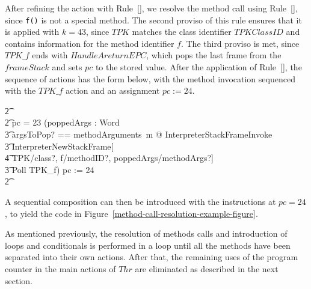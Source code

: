 After refining the action with
Rule~[], we resolve the method call
using Rule~[], since \texttt{f()}
is not a special method.
The second proviso of this rule ensures that it is applied with
$k = 43$, since $TPK$ matches the class identifier $TPKClassID$ and
contains information for the method identifier $f$.
The third proviso is met, since $TPK\_f$ ends with $HandleAreturnEPC$,
which pops the last frame from the $frameStack$ and sets $pc$ to the
stored value.
After the application of Rule~[],
the sequence of actions has the form below, with the method invocation
sequenced with the $TPK\_f$ action and an assignment $pc := 24$.
\begin{circusaction}
  \t2 {} \cdots {} \\
  \t2 {} \circelse pc = 23 \circthen (\circvar poppedArgs : \seq Word \circspot \\
  \t3 \lschexpract \exists argsToPop? == methodArguments~m @ InterpreterStackFrameInvoke \rschexpract \circseq \\
  \t3 \lschexpract InterpreterNewStackFrame[ \\
  \t4 TPK/class?, f/methodID?, poppedArgs/methodArgs?] \rschexpract \circseq \\
  \t3 Poll \circseq TPK\_f) \circseq pc := 24 \\
  \t2 {} \cdots {}
\end{circusaction}
A sequential composition can then be introduced with the instructions
at $pc = 24$, to yield the code in
Figure~\ref{method-call-resolution-example-figure}.

As mentioned previously, the resolution of methods calls and
introduction of loops and conditionals is performed in a loop until
all the methods have been separated into their own actions.
After that, the remaining uses of the program counter in the main
actions of $Thr$ are eliminated as described in the next section.
